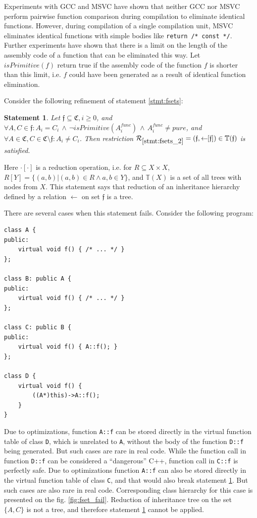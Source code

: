 \documentclass[times, 10pt,twocolumn]{article}
\newcommand{\gC}{\mathfrak{C}}
\newcommand{\gf}{\mathfrak{f}}
\newcommand{\cR}{\mathcal{R}}
\newcommand{\nT}{\mathbb{T}}
\newcommand{\pure}{\textit{pure}}
\newcommand{\func}{\textit{func}}
\newcommand{\isPrim}{\textit{isPrimitive}}
\newtheorem{statement}{Statement}
\begin{document}
Experiments with GCC and MSVC have shown that
neither GCC nor MSVC perform pairwise function comparison during compilation
to eliminate identical functions.
However, during compilation of a single compilation unit,
MSVC eliminates identical functions with simple bodies
like \lstinline{return /* const */}.
Further experiments have shown that there is a limit on the length
of the assembly code of a function that can be eliminated this way.
Let $\isPrim(f)$ return true if the assembly code of the function $f$
is shorter than this limit,
i.e. $f$ could have been generated as a result
of identical function elimination.

Consider the following refinement of statement \ref{stmt:fsets}:
\begin{statement}\label{stmt:fsets_2}
Let $\gf \subseteq \gC, i \ge 0$,
and $\forall A, C \in \gf: A_i = C_i \, \wedge \, \neg \isPrim(A_i^{\func}) \, \wedge \, A_i^{\func} \ne \pure$,
and $\forall A \in \gC, C \in \gC \setminus \gf: A_i \ne C_i$.
Then restriction $\cR_{\ref{stmt:fsets_2}} = (\gf, \leftarrow \!\! [\gf]) \in \nT(\gf)$ is satisfied.
\end{statement}
Here $\cdot [\cdot ]$ is a reduction operation,
i.e. for $R \subseteq X \times X$, $R[Y] = \{(a, b) | (a, b) \in R \wedge a, b \in Y \}$,
and $\nT(X)$ is a set of all trees with nodes from $X$.
This statement says that reduction of an inheritance hierarchy
defined by a relation $\leftarrow$ on set $\gf$ is a tree.

There are several cases when this statement fails.
Consider the following program:

{
\lstset{basicstyle=\footnotesize}
\begin{lstlisting}
class A {
public:
    virtual void f() { /* ... */ }
};

class B: public A {
public:
    virtual void f() { /* ... */ }
};

class C: public B {
public:
    virtual void f() { A::f(); }
};

class D {
    virtual void f() {
        ((A*)this)->A::f();
    }
}
\end{lstlisting}
}

Due to optimizations, function \lstinline{A::f} can be stored
directly in the virtual function table of class \lstinline{D},
which is unrelated to \lstinline{A},
without the body of the function \lstinline{D::f} being generated.
But such cases are rare in real code.
While the function call in function \lstinline{D::f}
can be considered a ``dangerous'' C++,
function call in \lstinline{C::f} is perfectly safe.
Due to optimizations function \lstinline{A::f}
can also be stored directly in the virtual function table
of class \lstinline{C},
and that would also break statement \ref{stmt:fsets_2}.
But such cases are also rare in real code.
Corresponding class hierarchy for this case is presented
on the fig. \ref{fig:fset_fail}.
Reduction of inheritance tree on the set $\{A, C\}$ is not a tree,
and therefore statement \ref{stmt:fsets_2} cannot be applied.
\end{document}
